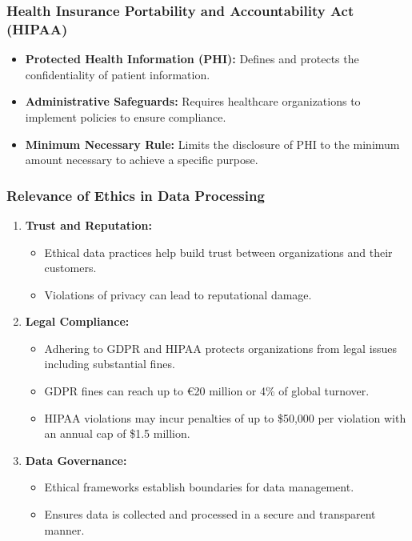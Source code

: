 \documentclass[aspectratio=169]{beamer}
\begin{document}
\begin{frame}[fragile]
    \frametitle{Health Insurance Portability and Accountability Act (HIPAA)}
    \begin{itemize}
        \item \textbf{Protected Health Information (PHI):} Defines and protects the confidentiality of patient information.
        \item \textbf{Administrative Safeguards:} Requires healthcare organizations to implement policies to ensure compliance.
        \item \textbf{Minimum Necessary Rule:} Limits the disclosure of PHI to the minimum amount necessary to achieve a specific purpose.
    \end{itemize}
\end{frame}

\begin{frame}[fragile]
    \frametitle{Relevance of Ethics in Data Processing}
    \begin{enumerate}
        \item \textbf{Trust and Reputation:} 
            \begin{itemize}
                \item Ethical data practices help build trust between organizations and their customers.
                \item Violations of privacy can lead to reputational damage.
            \end{itemize}
        \item \textbf{Legal Compliance:} 
            \begin{itemize}
                \item Adhering to GDPR and HIPAA protects organizations from legal issues including substantial fines.
                \item GDPR fines can reach up to €20 million or 4\% of global turnover.
                \item HIPAA violations may incur penalties of up to \$50,000 per violation with an annual cap of \$1.5 million.
            \end{itemize}
        \item \textbf{Data Governance:}
            \begin{itemize}
                \item Ethical frameworks establish boundaries for data management.
                \item Ensures data is collected and processed in a secure and transparent manner.
            \end{itemize}
    \end{enumerate}
\end{frame}
\end{document}
